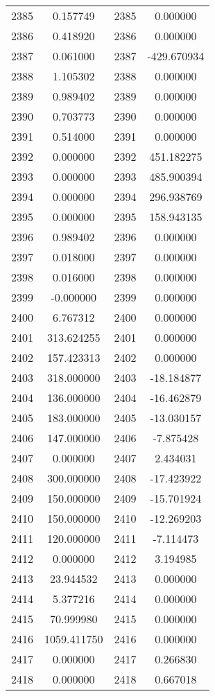 \documentclass[12pt]{article}
\begin{document}
\begin{longtable}{@{}cccc@{}}
2385 & 0.157749 & 2385 & 0.000000 \\
2386 & 0.418920 & 2386 & 0.000000 \\
2387 & 0.061000 & 2387 & -429.670934 \\
2388 & 1.105302 & 2388 & 0.000000 \\
2389 & 0.989402 & 2389 & 0.000000 \\
2390 & 0.703773 & 2390 & 0.000000 \\
2391 & 0.514000 & 2391 & 0.000000 \\
2392 & 0.000000 & 2392 & 451.182275 \\
2393 & 0.000000 & 2393 & 485.900394 \\
2394 & 0.000000 & 2394 & 296.938769 \\
2395 & 0.000000 & 2395 & 158.943135 \\
2396 & 0.989402 & 2396 & 0.000000 \\
2397 & 0.018000 & 2397 & 0.000000 \\
2398 & 0.016000 & 2398 & 0.000000 \\
2399 & -0.000000 & 2399 & 0.000000 \\
2400 & 6.767312 & 2400 & 0.000000 \\
2401 & 313.624255 & 2401 & 0.000000 \\
2402 & 157.423313 & 2402 & 0.000000 \\
2403 & 318.000000 & 2403 & -18.184877 \\
2404 & 136.000000 & 2404 & -16.462879 \\
2405 & 183.000000 & 2405 & -13.030157 \\
2406 & 147.000000 & 2406 & -7.875428 \\
2407 & 0.000000 & 2407 & 2.434031 \\
2408 & 300.000000 & 2408 & -17.423922 \\
2409 & 150.000000 & 2409 & -15.701924 \\
2410 & 150.000000 & 2410 & -12.269203 \\
2411 & 120.000000 & 2411 & -7.114473 \\
2412 & 0.000000 & 2412 & 3.194985 \\
2413 & 23.944532 & 2413 & 0.000000 \\
2414 & 5.377216 & 2414 & 0.000000 \\
2415 & 70.999980 & 2415 & 0.000000 \\
2416 & 1059.411750 & 2416 & 0.000000 \\
2417 & 0.000000 & 2417 & 0.266830 \\
2418 & 0.000000 & 2418 & 0.667018 \\

\end{longtable}
\end{document}
